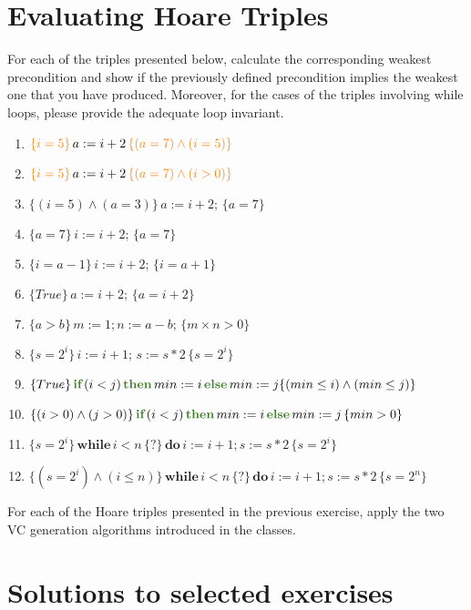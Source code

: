 \documentclass[11pt]{article}
\newcommand{\kw}[1]{{\color{OliveGreen}{#1}}}
\newcommand{\hoaret}[3]{{\color{BurntOrange}{\{#1\}}}\,#2\,{\color{BurntOrange}{\{#3\}}}}
\begin{document}
\newcommand{\compn}[1]{\textsf{\textcolor{purple}{#1}}\xspace}
\newcommand{\chn}[1]{\textsf{\textcolor{teal}{#1}}\xspace}

\section*{Evaluating Hoare Triples}

 For each of the triples presented below, calculate the corresponding weakest precondition and show if the previously defined precondition implies the weakest one that you have produced. Moreover, for the cases of the triples involving while loops, please provide the adequate loop invariant.
\begin{enumerate}
  \item $\hoaret{i = 5}{a := i + 2}{(a = 7) \land (i = 5)}$
  \item $\hoaret{i = 5}{a := i + 2}{(a = 7) \land (i > 0)}$
  \item $\{(i = 5) \land (a = 3)\}\,a := i + 2;\,\{a = 7\}$
  \item $\{a = 7\}\,i := i + 2;\,\{a = 7\}$
  \item $\{i = a - 1\}\,i := i + 2;\,\{i = a + 1\}$
  \item $\{True\}\,a := i + 2;\,\{a = i + 2\}$
  \item $\{a > b\}\,m := 1; n := a - b;\,\{m \times n > 0\}$
  \item $\{s = 2^i\}\,i := i + 1;\,s := s * 2\,\{s = 2^i\}$
  \item $\{True\}\,\textbf{\kw{if}}\,(i<j)\,\textbf{\kw{then}}\,min := i\,\textbf{\kw{else}}\,min := j\{(min \leq i) \land (min \leq j)\}$
  \item $\{(i > 0) \land (j > 0)\}\,\textbf{\kw{if}}\,(i<j)\,\textbf{\kw{then}}\,min := i\,\textbf{\kw{else}}\,min := j\,\{min > 0\}$
  \item $\{s = 2^i\}\,\textbf{while}\,i<n\,\{?\}\,\textbf{do}\,i := i +1 ;s := s*2\,\{s = 2^i\}$
  \item $\{(s = 2^i) \land (i \leq n)\}\,\textbf{while}\,i<n\,\{?\}\,\textbf{do}\,i := i +1 ;s := s*2\,\{s = 2^n\}$
\end{enumerate}


 For each of the Hoare triples presented in the previous exercise, apply the two VC generation algorithms introduced in the classes.

\section*{Solutions to selected exercises}
\end{document}
